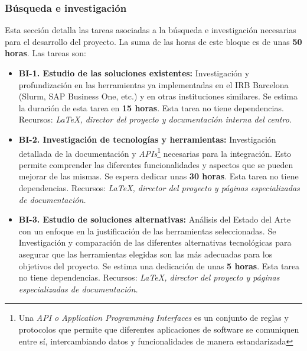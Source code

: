 \subsubsection{Búsqueda e investigación}
Esta sección detalla las tareas asociadas a la búsqueda e investigación necesarias para el desarrollo del proyecto.
La suma de las horas de este bloque es de unas \textbf{50 horas}. Las tareas son: 
\begin{itemize}
    \item \textbf{BI-1. Estudio de las soluciones existentes:} Investigación y profundización en las herramientas ya implementadas en el 
    IRB Barcelona (Slurm, SAP Business One, etc.) y en otras instituciones similares. Se estima la duración de esta tarea en \textbf{15 horas}.
    \newline Esta tarea no tiene dependencias.
    \newline Recursos: \textit {LaTeX, director del proyecto y documentación interna del centro.}
    
    \item \textbf{BI-2. Investigación de tecnologías y herramientas:} Investigación detallada de la documentación y \textit{APIs}\footnote{Una \textit{API o Application 
    Programming Interfaces} es un conjunto de reglas y protocolos que permite que diferentes aplicaciones de software se comuniquen entre sí, intercambiando datos y 
    funcionalidades de manera estandarizada} necesarias para la integración. Esto permite comprender las diferentes funcionalidades y 
    aspectos que se pueden mejorar de las mismas. Se espera dedicar unas \textbf{30 horas}.
    \newline Esta tarea no tiene dependencias.
    \newline Recursos: \textit {LaTeX, director del proyecto y páginas especializadas de documentación.}
    
    \item \textbf{BI-3. Estudio de soluciones alternativas:} Análisis del Estado del Arte con un enfoque en la justificación de las herramientas seleccionadas.
    Se Investigación y comparación de las  diferentes alternativas tecnológicas para asegurar que las herramientas elegidas son las más adecuadas para los objetivos del proyecto. Se estima una dedicación de unas \textbf{5 horas}.
    \newline Esta tarea no tiene dependencias.
    \newline Recursos: \textit {LaTeX, director del proyecto y páginas especializadas de documentación.}
\end{itemize}